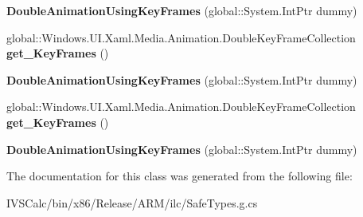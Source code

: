 \begin{DoxyCompactItemize}
{\bfseries Double\+Animation\+Using\+Key\+Frames} (global\+::\+System.\+Int\+Ptr dummy)
\item 
\mbox{\label{class_windows_1_1_u_i_1_1_xaml_1_1_media_1_1_animation_1_1_double_animation_using_key_frames_a8b2144bad411b6eacce9e055ef1e6a97}} 
global\+::\+Windows.\+U\+I.\+Xaml.\+Media.\+Animation.\+Double\+Key\+Frame\+Collection {\bfseries get\+\_\+\+Key\+Frames} ()
\item 
\mbox{\label{class_windows_1_1_u_i_1_1_xaml_1_1_media_1_1_animation_1_1_double_animation_using_key_frames_a0ed120d45bdb1f96c1a8013083b38af5}} 
{\bfseries Double\+Animation\+Using\+Key\+Frames} (global\+::\+System.\+Int\+Ptr dummy)
\item 
\mbox{\label{class_windows_1_1_u_i_1_1_xaml_1_1_media_1_1_animation_1_1_double_animation_using_key_frames_a8b2144bad411b6eacce9e055ef1e6a97}} 
global\+::\+Windows.\+U\+I.\+Xaml.\+Media.\+Animation.\+Double\+Key\+Frame\+Collection {\bfseries get\+\_\+\+Key\+Frames} ()
\item 
\mbox{\label{class_windows_1_1_u_i_1_1_xaml_1_1_media_1_1_animation_1_1_double_animation_using_key_frames_a0ed120d45bdb1f96c1a8013083b38af5}} 
{\bfseries Double\+Animation\+Using\+Key\+Frames} (global\+::\+System.\+Int\+Ptr dummy)
\end{DoxyCompactItemize}


The documentation for this class was generated from the following file\+:\begin{DoxyCompactItemize}
\item 
I\+V\+S\+Calc/bin/x86/\+Release/\+A\+R\+M/ilc/Safe\+Types.\+g.\+cs\end{DoxyCompactItemize}
